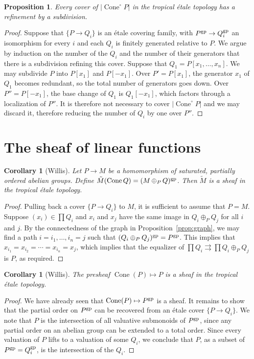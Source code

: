 \documentclass[12pt]{amsart}
\newtheorem{proposition}[theorem]{Proposition}
\newtheorem{corollary}[theorem]{Corollary}
\theoremstyle{definition}
\theoremstyle{remark}
\def\Cone{\operatorname{Cone}}
\begin{document}
\begin{proposition}
Every cover of $|\Cone^\circ P|$ in the tropical \'etale topology has a refinement by a subdivision.
\end{proposition}
\begin{proof}
Suppose that $\{ P \to Q_i \}$ is an \'etale covering family, with $P^{\rm gp} \to Q_i^{\rm gp}$ an isomorphism for every $i$ and each $Q_i$ is finitely generated relative to $P$.  We argue by induction on the number of the $Q_i$ and the number of their generators that there is a subdivision refining this cover.  Suppose that $Q_1 = P[x_1, \ldots, x_n]$.  We may subdivide $P$ into $P[x_1]$ and $P[-x_1]$.  Over $P' = P[x_1]$, the generator $x_1$ of $Q_1$ becomes redundant, so the total number of generators goes down.  Over $P'' = P[-x_1]$, the base change of $Q_1$ is $Q_1[-x_1]$, which factors through a localization of $P''$.  It is therefore not necessary to cover $|\Cone^\circ P|$ and we may discard it, therefore reducing the number of $Q_i$ by one over $P''$.
\end{proof}


\section{The sheaf of linear functions}

\begin{corollary}[Willis]
Let $P \to M$ be a homomorphism of saturated, partially ordered abelian groups.  Define $\tilde M(\Cone Q) = (M \mathop\oplus_P Q)^{\rm gp}$.  Then $\tilde M$ is a sheaf in the tropical \'etale topology.
\end{corollary}
\begin{proof}
Pulling back a cover $\{ P \to Q_i \}$ to $M$, it is sufficient to assume that $P = M$.  Suppose $(x_i) \in \prod Q_i$ and $x_i$ and $x_j$ have the same image in $Q_i \oplus_P Q_j$ for all $i$ and $j$.  By the connectedness of the graph in Proposition~\ref{prop:graph}, we may find a path $i = i_1, \ldots, i_n = j$ such that $(Q_i \oplus_P Q_j)^{\rm gp} = P^{\rm gp}$.  This implies that $x_{i_1} = x_{i_2} = \cdots = x_{i_n} = x_j$, which implies that the equalizer of $\prod Q_i \rightrightarrows \prod Q_i \oplus_P Q_j$ is $P$, as required.
\end{proof}

\begin{corollary}[Willis] \label{cor:L-sheaf}
The presheaf $\Cone(P) \mapsto P$ is a sheaf in the tropical \'etale topology.
\end{corollary}
\begin{proof}
We have already seen that $\Cone(P) \mapsto P^{\rm gp}$ is a sheaf.  It remains to show that the partial order on $P^{\rm gp}$ can be recovered from an \'etale cover $\{ P \to Q_i \}$.  We note that $P$ is the intersection of all valuative submonoids of $P^{\rm gp}$, since any partial order on an abelian group can be extended to a total order.  Since every valuation of $P$ lifts to a valuation of some $Q_i$, we conclude that $P$, as a subset of $P^{\rm gp} = Q_i^{\rm gp}$, is the intersection of the $Q_i$.
\end{proof}
\end{document}
